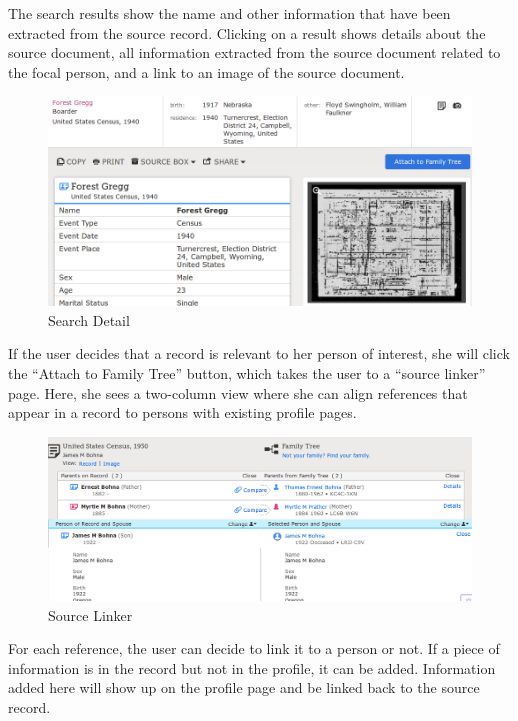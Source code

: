 \documentclass[format=siggraph, review=true]{acmart}
\begin{document}
The search results show the name and other information that have been
extracted from the source record. Clicking on a result shows details
about the source document, all information extracted from the source
document related to the focal person, and a link to an image of the
source document.

\begin{figure}[h]
\includegraphics[width=\columnwidth]{images/familysearch/search_result_detail.png}
\caption{Search Detail}
\label{fig:search-details}
\end{figure}

If the user decides that a record is relevant to her person of
interest, she will click the ``Attach to Family Tree'' button, which
takes the user to a ``source linker'' page. Here, she sees a two-column view
where she can align references that appear in a record to
persons with existing profile pages.

\begin{figure}[h]
\includegraphics[width=\columnwidth]{images/familysearch/source_linker.png}
\caption{Source Linker}
\label{fig:source-linker}
\end{figure}

For each reference, the user can decide to link it to a person or not. If a
piece of information is in the record but not in the profile, it can
be added. Information added here will show up on the profile page and
be linked back to the source record.
\end{document}
